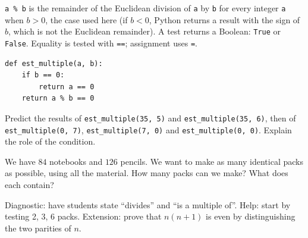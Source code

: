 \begin{method}
\texttt{a \% b} is the remainder of the Euclidean division of \texttt{a} by \texttt{b} for every integer \texttt{a} when $b>0$, the case used here (if $b<0$, Python returns a result with the sign of $b$, which is not the Euclidean remainder). A test returns a Boolean: \texttt{True} or \texttt{False}. Equality is tested with \texttt{==}; assignment uses \texttt{=}.
\end{method}
\begin{lstlisting}
def est_multiple(a, b):
    if b == 0:
        return a == 0
    return a % b == 0
\end{lstlisting}
\begin{example}Predict the results of \texttt{est\_multiple(35, 5)} and \texttt{est\_multiple(35, 6)}, then of \texttt{est\_multiple(0, 7)}, \texttt{est\_multiple(7, 0)} and \texttt{est\_multiple(0, 0)}. Explain the role of the condition.\end{example}
\begin{example}[Problem]We have $84$ notebooks and $126$ pencils. We want to make as many identical packs as possible, using all the material. How many packs can we make? What does each contain?\end{example}
\begin{teachernote}Diagnostic: have students state ``divides'' and ``is a multiple of''. Help: start by testing 2, 3, 6 packs. Extension: prove that $n(n+1)$ is even by distinguishing the two parities of $n$.\end{teachernote}
